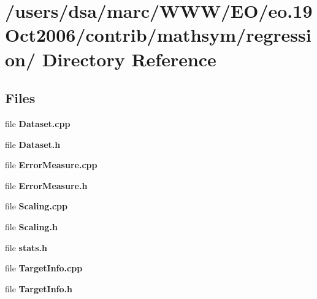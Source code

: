 \section{/users/dsa/marc/WWW/EO/eo.19Oct2006/contrib/mathsym/regression/ Directory Reference}
\label{dir_000012}
\subsection*{Files}
\begin{CompactItemize}
\item 
file {\bf Dataset.cpp}
\item 
file {\bf Dataset.h}
\item 
file {\bf ErrorMeasure.cpp}
\item 
file {\bf ErrorMeasure.h}
\item 
file {\bf Scaling.cpp}
\item 
file {\bf Scaling.h}
\item 
file {\bf stats.h}
\item 
file {\bf TargetInfo.cpp}
\item 
file {\bf TargetInfo.h}
\end{CompactItemize}
